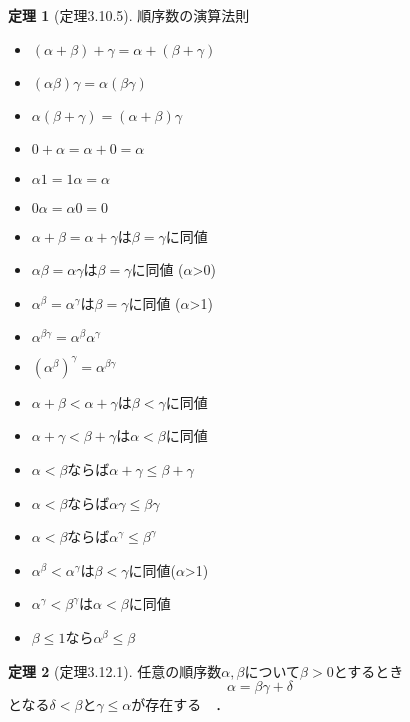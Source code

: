 \documentclass[dvipdfmx,a4paper,11pt]{article}
\theoremstyle{definition}
\newtheorem{thm}{定理}
\begin{document}
 \begin{tcolorbox}
 [colback = white, colframe = green!35!black, fonttitle = \bfseries,breakable = true]
\begin{thm}[定理3.10.5]
順序数の演算法則
\begin{itemize}
\item $(\alpha + \beta) + \gamma = \alpha + (\beta + \gamma)$
\item $(\alpha \beta)  \gamma = \alpha (\beta  \gamma)$
\item $\alpha (\beta + \gamma)= (\alpha + \beta)  \gamma$
\item $0 + \alpha = \alpha + 0 =\alpha$
\item $\alpha 1 = 1\alpha = \alpha$
\item $0  \alpha = \alpha  0 =0$
\item $\alpha  + \beta = \alpha + \gamma$は$\beta= \gamma$に同値
\item $\alpha  \beta = \alpha \gamma$は$\beta= \gamma$に同値 ($\alpha$>0)
\item $\alpha^\beta = \alpha^\gamma$は$\beta= \gamma$に同値 ($\alpha$>1)
\item $\alpha^{\beta\gamma} = \alpha^\beta  \alpha^\gamma$
\item  $(\alpha^{\beta})^{\gamma} = \alpha^{\beta \gamma}$
\item $\alpha  + \beta < \alpha + \gamma$は$\beta <\gamma$に同値
\item $\alpha  + \gamma < \beta + \gamma$は$\alpha <\beta$に同値
\item $\alpha <\beta$ならば$\alpha  + \gamma \le \beta + \gamma$
\item $\alpha <\beta$ならば$\alpha  \gamma \le \beta \gamma$
\item $\alpha <\beta$ならば$\alpha^\gamma \le \beta^\gamma$
\item $\alpha^\beta< \alpha^\gamma$は$\beta<\gamma$に同値($\alpha$>1)
\item $\alpha^\gamma< \beta^\gamma$は$\alpha<\beta$に同値
\item $\beta \le 1$なら$\alpha^\beta \le \beta$
\end{itemize}
\end{thm}
\end{tcolorbox}

 \begin{tcolorbox}
 [colback = white, colframe = green!35!black, fonttitle = \bfseries,breakable = true]
\begin{thm}[定理3.12.1]
任意の順序数$\alpha, \beta$について$\beta>0$とするとき
$$
\alpha = \beta \gamma + \delta
$$
となる$\delta < \beta$と$\gamma \le \alpha$が存在する　．
\end{thm}
\end{tcolorbox}
\end{document}
